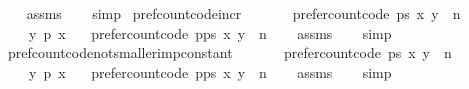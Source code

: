 \begin{isabellebody}
%
\isadelimproof
\ \ %
\endisadelimproof
%
\isatagproof
{}\isamarkupfalse%
\ assms\isanewline
\ \ \isamarkupfalse%
\ simp%
\endisatagproof
{\isafoldproof}%
%
\isadelimproof
\isanewline
%
\endisadelimproof
\isanewline
{}\isamarkupfalse%
\ pref{\isacharunderscore}{\kern0pt}count{\isacharunderscore}{\kern0pt}code{\isacharunderscore}{\kern0pt}incr{\isacharcolon}{\kern0pt}\isanewline
\ \ \isanewline
\ \ \ \ {\isachardoublequoteopen}prefer{\isacharunderscore}{\kern0pt}count{\isacharunderscore}{\kern0pt}code\ ps\ x\ y\ {\isacharequal}{\kern0pt}\ n{\isachardoublequoteclose}\ \isanewline
\ \ \ \ {\isachardoublequoteopen}y\ {\isasympreceq}\isactrlsub p\ x{\isachardoublequoteclose}\isanewline
\ \ \ {\isachardoublequoteopen}prefer{\isacharunderscore}{\kern0pt}count{\isacharunderscore}{\kern0pt}code\ {\isacharparenleft}{\kern0pt}p{\isacharhash}{\kern0pt}ps{\isacharparenright}{\kern0pt}\ x\ y\ {\isacharequal}{\kern0pt}\ n{\isacharplus}{\kern0pt}{}{\isachardoublequoteclose}\isanewline
%
\isadelimproof
\ \ %
\endisadelimproof
%
\isatagproof
{}\isamarkupfalse%
\ assms\isanewline
\ \ \isamarkupfalse%
\ simp%
\endisatagproof
{\isafoldproof}%
%
\isadelimproof
\isanewline
%
\endisadelimproof
\isanewline
{}\isamarkupfalse%
\ pref{\isacharunderscore}{\kern0pt}count{\isacharunderscore}{\kern0pt}code{\isacharunderscore}{\kern0pt}not{\isacharunderscore}{\kern0pt}smaller{\isacharunderscore}{\kern0pt}imp{\isacharunderscore}{\kern0pt}constant{\isacharcolon}{\kern0pt}\isanewline
\ \ \isanewline
\ \ \ \ {\isachardoublequoteopen}prefer{\isacharunderscore}{\kern0pt}count{\isacharunderscore}{\kern0pt}code\ ps\ x\ y\ {\isacharequal}{\kern0pt}\ n{\isachardoublequoteclose}\ \isanewline
\ \ \ \ {\isachardoublequoteopen}{\isasymnot}{\isacharparenleft}{\kern0pt}y\ {\isasympreceq}\isactrlsub p\ x{\isacharparenright}{\kern0pt}{\isachardoublequoteclose}\isanewline
\ \ \ {\isachardoublequoteopen}prefer{\isacharunderscore}{\kern0pt}count{\isacharunderscore}{\kern0pt}code\ {\isacharparenleft}{\kern0pt}p{\isacharhash}{\kern0pt}ps{\isacharparenright}{\kern0pt}\ x\ y\ {\isacharequal}{\kern0pt}\ n{\isachardoublequoteclose}\isanewline
%
\isadelimproof
\ \ %
\endisadelimproof
%
\isatagproof
{}\isamarkupfalse%
\ assms\isanewline
\ \ \isamarkupfalse%
\ simp%
\endisatagproof
{\isafoldproof}%
%
\isadelimproof
\isanewline
%
\endisadelimproof
\isanewline
{}\isamarkupfalse%

\end{isabellebody}
